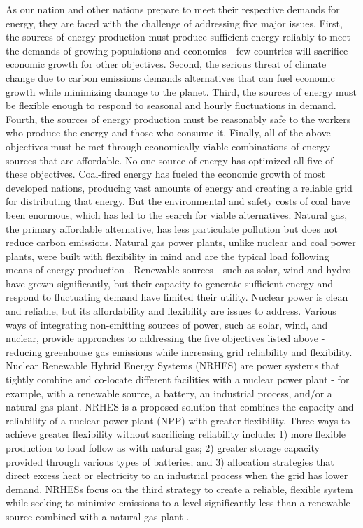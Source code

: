 \documentclass[12pt]{UIdahoMastersThesis}
\begin{document}
As our nation and other nations prepare to meet their respective demands for energy, they are faced with the challenge of addressing five major issues. First, the sources of energy production must produce sufficient energy reliably to meet the demands of growing populations and economies - few countries will sacrifice economic growth for other objectives. Second, the serious threat of climate change due to carbon emissions demands alternatives that can fuel economic growth while minimizing damage to the planet. Third, the sources of energy must be flexible enough to respond to seasonal and hourly fluctuations in demand. Fourth, the sources of energy production must be reasonably safe to the workers who produce the energy and those who consume it. Finally, all of the above objectives must be met through economically viable combinations of energy sources that are affordable.
No one source of energy has optimized all five of these objectives. Coal-fired energy has fueled the economic growth of most developed nations, producing vast amounts of energy and creating a reliable grid for distributing that energy. But the environmental and safety costs of coal have been enormous, which has led to the search for viable alternatives. Natural gas, the primary affordable alternative, has less particulate pollution but does not reduce carbon emissions. Natural gas power plants, unlike nuclear and coal power plants, were built with flexibility in mind and are the typical load following means of energy production \cite{MITEnergyInitiative2011}. Renewable sources - such as solar, wind and hydro - have grown significantly, but their capacity to generate sufficient energy and respond to fluctuating demand have limited their utility. Nuclear power is clean and reliable, but its affordability and flexibility are issues to address.
Various ways of integrating non-emitting sources of power, such as solar, wind, and nuclear, provide approaches to addressing the five objectives listed above - reducing greenhouse gas emissions while increasing grid reliability and flexibility. Nuclear Renewable Hybrid Energy Systems (NRHES) are power systems that tightly combine and co-locate different facilities with a nuclear power plant - for example, with a renewable source, a battery, an industrial process, and/or a natural gas plant.  NRHES is a proposed solution that combines the capacity and reliability of a nuclear power plant (NPP) with greater flexibility.  Three ways to achieve greater flexibility without sacrificing reliability include: 1) more flexible production to load follow as with natural gas; 2) greater storage capacity provided through various types of batteries; and 3)  allocation strategies that direct excess heat or electricity to an industrial process when the grid has lower demand. NRHESs focus on the third strategy to create a reliable, flexible system while seeking to minimize emissions to a level significantly less than a renewable source combined with a natural gas plant \cite{Baker2016}.  
\end{document}
